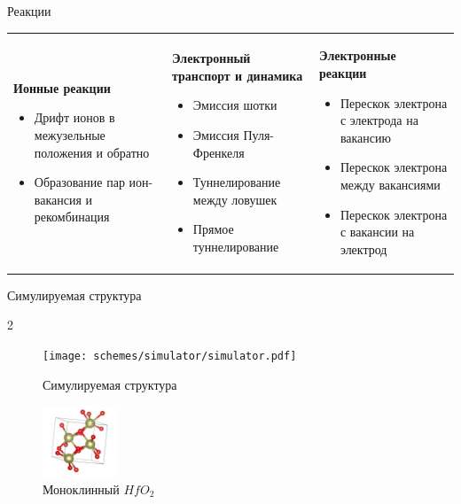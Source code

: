 \documentclass{beamer}%
\begin{document}
\begin{frame} {Реакции}

\begin{tabular}{p{3.3cm} | p{3.3cm}| p{3.3cm}}
    \textbf{Ионные реакции}
    \begin{itemize}
        \item Дрифт ионов в межузельные положения и обратно
        \item Образование пар ион-вакансия и рекомбинация
        
    \end{itemize} &
    \textbf{Электронный транспорт и динамика}
    \begin{itemize}
        \item Эмиссия шотки
        \item Эмиссия Пуля-Френкеля
        \item Туннелирование между ловушек
        \item Прямое туннелирование
    \end{itemize} &
    \textbf{Электронные реакции}
    \begin{itemize}
        \item Перескок электрона с электрода на вакансию
        \item Перескок электрона между вакансиями
        \item Перескок электрона с вакансии на электрод
    \end{itemize}




\end{tabular}

\end{frame}

\begin{frame} {Симулируемая структура}

    \begin {multicols} {2}
    \begin{figure}
        \centering
        \texttt{[image: schemes/simulator/simulator.pdf]}
        \caption {Симулируемая структура}
    \end{figure}
    
    \columnbreak

    \begin{figure}
        \centering
        \includegraphics[height=80px]{img/POSCAR.jpg}
        \vspace {12px}
        \caption {Моноклинный \(HfO_2\)}
    \end{figure}

\end{multicols}

\end{frame}
\end{document}
